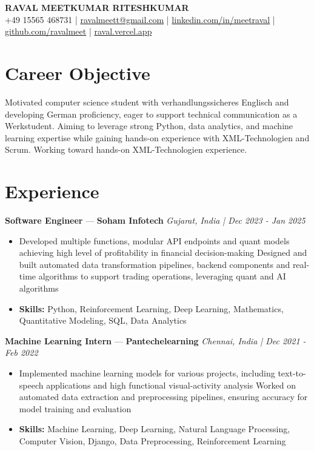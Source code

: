 \documentclass[a4paper,10pt]{article}
\begin{document}
\begin{center}
  {\Large\bfseries RAVAL MEETKUMAR RITESHKUMAR}\\[2pt]
  {\small +49 15565 468731 \;|\; \href{mailto:ravalmeett@gmail.com}{ravalmeett@gmail.com} \;|\; \href{https://www.linkedin.com/in/meetraval/}{linkedin.com/in/meetraval} \;|\; \href{https://github.com/ravalmeet}{github.com/ravalmeet} \;|\; \href{https://raval.vercel.app/}{raval.vercel.app}}
\end{center}
\vspace{-3pt}

\section*{Career Objective}
Motivated computer science student with verhandlungssicheres Englisch and developing German proficiency, eager to support technical communication as a Werkstudent. Aiming to leverage strong Python, data analytics, and machine learning expertise while gaining hands-on experience with XML-Technologien and Scrum. Working toward hands-on XML-Technologien experience.\par

\section*{Experience}
\textbf{Software Engineer} — \textbf{Soham Infotech} \hfill \textit{Gujarat, India \;|\; Dec 2023 - Jan 2025}\par
\vspace{1pt}
\begin{itemize}
  \item Developed multiple functions, modular API endpoints and quant models achieving high level of profitability in financial decision-making Designed and built automated data transformation pipelines, backend components and real-time algorithms to support trading operations, leveraging quant and AI algorithms
  \item \textbf{Skills:} Python, Reinforcement Learning, Deep Learning, Mathematics, Quantitative Modeling, SQL, Data Analytics
\end{itemize}
\vspace{3pt}
\textbf{Machine Learning Intern} — \textbf{Pantechelearning} \hfill \textit{Chennai, India \;|\; Dec 2021 - Feb 2022}\par
\vspace{1pt}
\begin{itemize}
  \item Implemented machine learning models for various projects, including text-to-speech applications and high functional visual-activity analysis Worked on automated data extraction and preprocessing pipelines, ensuring accuracy for model training and evaluation
  \item \textbf{Skills:} Machine Learning, Deep Learning, Natural Language Processing, Computer Vision, Django, Data Preprocessing, Reinforcement Learning
\end{itemize}
\end{document}
